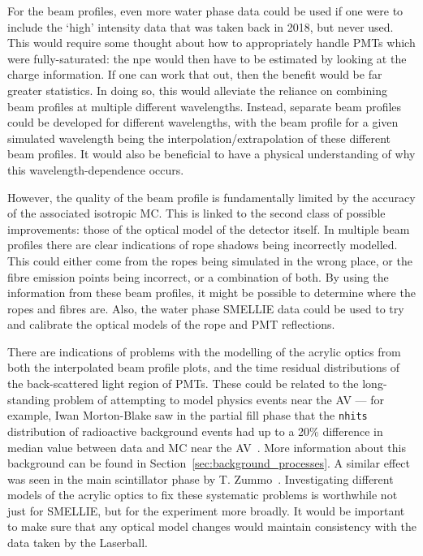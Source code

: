 For the beam profiles, even more water phase data could be used if one were to include the `high' intensity data that was taken back in 2018, but never used. This would require some thought about how to appropriately handle PMTs which were fully-saturated: the npe would then have to be estimated by looking at the charge information. If one can work that out, then the benefit would be far greater statistics. In doing so, this would alleviate the reliance on combining beam profiles at multiple different wavelengths. Instead, separate beam profiles could be developed for different wavelengths, with the beam profile for a given simulated wavelength being the interpolation/extrapolation of these different beam profiles. It would also be beneficial to have a physical understanding of why this wavelength-dependence occurs.

However, the quality of the beam profile is fundamentally limited by the accuracy of the associated isotropic MC. This is linked to the second class of possible improvements: those of the optical model of the detector itself. In multiple beam profiles there are clear indications of rope shadows being incorrectly modelled. This could either come from the ropes being simulated in the wrong place, or the fibre emission points being incorrect, or a combination of both. By using the information from these beam profiles, it might be possible to determine where the ropes and fibres are. Also, the water phase SMELLIE data could be used to try and calibrate the optical models of the rope and PMT reflections.

There are indications of problems with the modelling of the acrylic optics from both the interpolated beam profile plots, and the time residual distributions of the back-scattered light region of PMTs. These could be related to the long-standing problem of attempting to model physics events near the AV --- for example, Iwan Morton-Blake saw in the partial fill phase that the \texttt{nhits} distribution of  radioactive background events had up to a 20\% difference in median value between data and MC near the AV~\cite{morton-blakeFirstMeasurementReactor2021}. More information about this background can be found in Section~\ref{sec:background_processes}. A similar effect was seen in the main scintillator phase by T. Zummo~\cite{zummoResidualEnergyCorrection2023}. Investigating different models of the acrylic optics to fix these systematic problems is worthwhile not just for SMELLIE, but for the experiment more broadly. It would be important to make sure that any optical model changes would maintain consistency with the data taken by the Laserball.